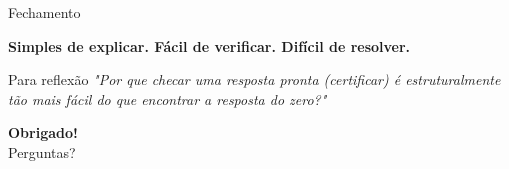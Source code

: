 \documentclass[10pt, aspectratio=169]{beamer}
\begin{document}
\begin{frame}{Fechamento}
    \begin{center}
        \Large \textbf{Simples de explicar. Fácil de verificar. Difícil de resolver.}
    \end{center}
    
    \vspace{2em}
    \begin{block}{Para reflexão}
        \textit{"Por que checar uma resposta pronta (certificar) é estruturalmente tão mais fácil do que encontrar a resposta do zero?"}
    \end{block}
    
    \vspace{2em}
    \begin{center}
        \textbf{Obrigado!} \\
        Perguntas?
    \end{center}
\end{frame}
\end{document}
